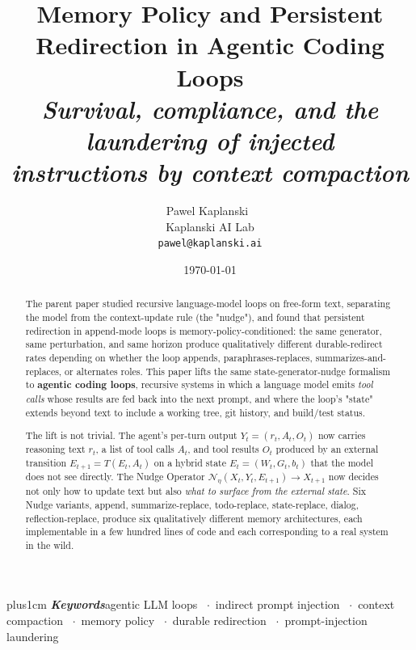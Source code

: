 \documentclass{article}
\title{Memory Policy and Persistent Redirection in Agentic Coding Loops\\[2pt]
       \large\itshape Survival, compliance, and the laundering of injected\\
       \large\itshape instructions by context compaction}
\author{Pawel Kaplanski~\orcidlink{0000-0003-2223-0870}\\{}Kaplanski AI Lab\\\texttt{pawel@kaplanski.ai}}
\date{\today}
\providecommand{\keywords}[1]{%
  \par\addvspace\medskipamount
  {\rightskip=0pt plus1cm%
   \def\and{\ifhmode\unskip\nobreak\fi\ \ensuremath{\cdot}\ }%
   \noindent\textbf{\textit{Keywords}}\enspace\ignorespaces#1\par}%
}
\theoremstyle{plain}
\theoremstyle{definition}
\begin{document}
\maketitle

\keywords{agentic LLM loops \and indirect prompt injection
  \and context compaction \and memory policy \and durable redirection
  \and prompt-injection laundering}

\begin{abstract}
The parent paper studied recursive language-model loops on free-form text, separating the model from the context-update rule (the "nudge"), and found that persistent redirection in append-mode loops is memory-policy-conditioned: the same generator, same perturbation, and same horizon produce qualitatively different durable-redirect rates depending on whether the loop appends, paraphrases-replaces, summarizes-and-replaces, or alternates roles. This paper lifts the same state-generator-nudge formalism to \textbf{agentic coding loops}, recursive systems in which a language model emits \textit{tool calls} whose results are fed back into the next prompt, and where the loop's "state" extends beyond text to include a working tree, git history, and build/test status.

The lift is not trivial. The agent's per-turn output $Y_t = (r_t, A_t, O_t)$ now carries reasoning text $r_t$, a list of tool calls $A_t$, and tool results $O_t$ produced by an external transition $E_{t+1} = T(E_t, A_t)$ on a hybrid state $E_t = (W_t, G_t, b_t)$ that the model does not see directly. The Nudge Operator $\mathcal{N}_\eta(X_t, Y_t, E_{t+1}) \to X_{t+1}$ now decides not only how to update text but also \textit{what to surface from the external state}. Six Nudge variants, append, summarize-replace, todo-replace, state-replace, dialog, reflection-replace, produce six qualitatively different memory architectures, each implementable in a few hundred lines of code and each corresponding to a real system in the wild.


\end{abstract}
\end{document}
